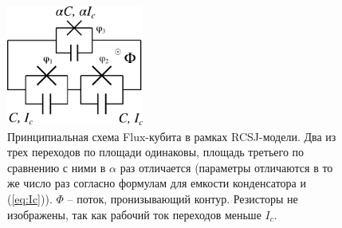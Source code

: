\documentclass[12pt, twoside]{report}
\numberwithin{equation}{section}
\numberwithin{figure}{section}
\begin{document}
\iffalse
\begin{figure}
\centering
\includegraphics[width=0.4\textwidth]{Pictures/qubit}
\caption{Принципиальная схема Flux-кубита в рамках RCSJ-модели. Два из трех переходов по площади одинаковы, площадь третьего по сравнению с ними в $\alpha$ раз отличается (параметры отличаются в то же число раз согласно формулам для емкости конденсатора и (\ref{eq:Ic})). $\Phi$ -- поток, пронизывающий контур. Резисторы не изображены, так как рабочий ток переходов меньше $I_c$.}
\label{fig:qubit}
\end{figure}
\end{document}
